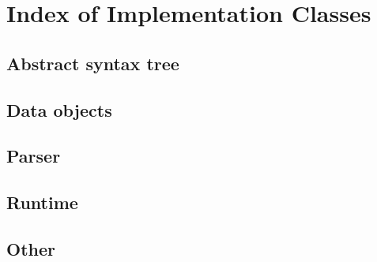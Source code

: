 \section{Index of Implementation Classes}

\subsection{Abstract syntax tree}

\subsection{Data objects}

\subsection{Parser}

\subsection{Runtime}

\subsection{Other}
